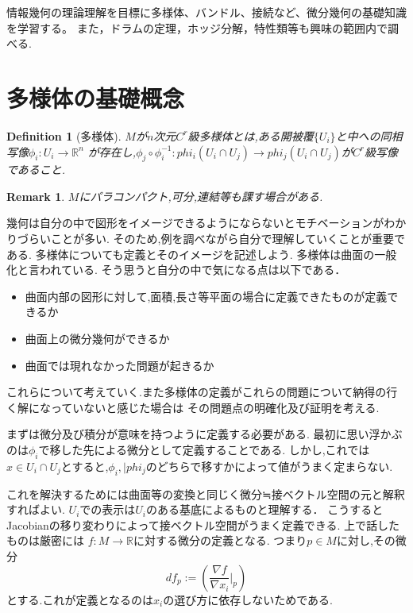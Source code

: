 \documentclass{ujarticle}
\newtheorem{dfn}[thm]{Definition}
\newtheorem*{rem}{Remark}
\begin{document}
情報幾何の理論理解を目標に多様体、バンドル、接続など、微分幾何の基礎知識を学習する。
また，ドラムの定理，ホッジ分解，特性類等も興味の範囲内で調べる.
\section{多様体の基礎概念}
\label{sec:多様体の基礎概念}

\begin{dfn}[多様体]
$M$が$n$次元$C^r$級多様体とは,ある開被覆$\{U_i\}$と中への同相写像$\phi_i:U_i \to \mathbb{R}^n$
が存在し,$\phi_j \circ \phi_i^{-1}:phi_i(U_i \cap U_j) \to phi_j(U_i \cap U_j)$が$C^r$級写像であること.
\end{dfn}
\begin{rem}
$M$にパラコンパクト,可分,連結等も課す場合がある.
\end{rem}

幾何は自分の中で図形をイメージできるようにならないとモチベーションがわかりづらいことが多い.
そのため,例を調べながら自分で理解していくことが重要である.
多様体についても定義とそのイメージを記述しよう.
多様体は曲面の一般化と言われている.
そう思うと自分の中で気になる点は以下である．
\begin{itemize}
  \item 曲面内部の図形に対して,面積,長さ等平面の場合に定義できたものが定義できるか
  \item 曲面上の微分幾何ができるか
  \item 曲面では現れなかった問題が起きるか
\end{itemize}
これらについて考えていく.また多様体の定義がこれらの問題について納得の行く解になっていないと感じた場合は
その問題点の明確化及び証明を考える.

まずは微分及び積分が意味を持つように定義する必要がある.
最初に思い浮かぶのは$\phi_i$で移した先による微分として定義することである.
しかし,これでは$x \in U_i \cap U_j$とすると,$\phi_i,|phi_j$のどちらで移すかによって値がうまく定まらない.

これを解決するためには曲面等の変換と同じく微分≒接ベクトル空間の元と解釈すればよい.
$U_i$での表示は$U_i$のある基底によるものと理解する．
こうするとJacobianの移り変わりによって接ベクトル空間がうまく定義できる.
上で話したものは厳密には
$f : M \to \mathbb{R}$に対する微分の定義となる.
つまり$p \in M$に対し,その微分
\begin{equation*}
 df_p:=(\frac{\nabla f }{\nabla x_i }|_p)
\end{equation*}
とする.これが定義となるのは$x_i$の選び方に依存しないためである.
\end{document}
